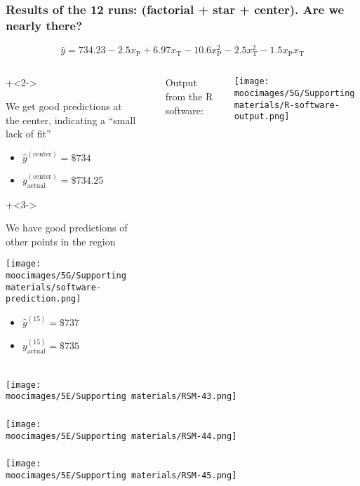 \documentclass[handout,11pt,aspectratio=169,mathserif]{beamer}
\begin{document}
\begin{frame}\frametitle{Results of the 12 runs: (factorial + star + center). Are we nearly there?}
	\[\hat{y} = 734.23 -2.5x_\text{P}    +    6.97  x_\text{T}    -10.6  x^2_\text{P}     -2.5  x^2_\text{T}     -1.5x_\text{P}x_\text{T}\]
	\begin{columns}[T]
			\begin{enumerate}
				\onslide+<2->{
					\item	We get good predictions at the center,
							indicating a ``small lack of fit''
							\begin{itemize}
								\item	$\hat{y}^{(\text{center})} = \$ 734$
								\item	$y^{(\text{center})}_\text{actual} = \$ 734.25$
							\end{itemize}
				}
				\onslide+<3->{
					\vspace{0.5cm}
					\item	We have good predictions of other points in the region
						\centerline{\texttt{[image: \\moocimages/5G/Supporting materials/software-prediction.png]}}
						\vspace{-0.3cm}
						\begin{itemize}
							\item	$\hat{y}^{(15)} = \$ 737$
							\item	$y^{(15)}_\text{actual} = \$ 735$
						\end{itemize}
					}
			\end{enumerate}
			
			\rule[3mm]{0.01cm}{60mm}%
		
			Output from the R software:

			\centerline{\texttt{[image: \\moocimages/5G/Supporting materials/R-software-output.png]}}

	\end{columns}
	
	
\end{frame}
\begin{frame}\frametitle{}
	\centerline{\texttt{[image: \\moocimages/5E/Supporting materials/RSM-43.png]}}
\end{frame}
\begin{frame}\frametitle{}
	\centerline{\texttt{[image: \\moocimages/5E/Supporting materials/RSM-44.png]}}
\end{frame}
\begin{frame}\frametitle{}
	\centerline{\texttt{[image: \\moocimages/5E/Supporting materials/RSM-45.png]}}
\end{frame}
\end{document}
